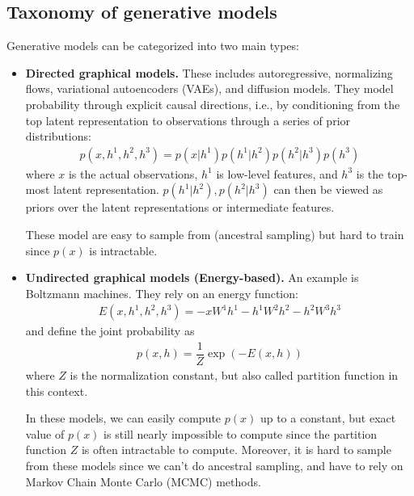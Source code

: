 \documentclass{mytufte-light}
\begin{document}
\subsection{Taxonomy of generative models}
Generative models can be categorized into two main types:
\begin{itemize}
    \item \textbf{Directed graphical models.} 
    These includes autoregressive, normalizing flows, variational autoencoders (VAEs), and diffusion models.
    They model probability through explicit causal directions, i.e., by 
    conditioning from the top latent representation to observations through 
    a series of prior distributions:
    \begin{align}
        p(x, h^1, h^2, h^3) = p(x|h^1) p(h^1|h^2) p(h^2|h^3) p(h^3)
    \end{align}
    where \( x \) is the actual observations, \( h^1 \) is low-level features, and \( h^3 \) is the top-most 
    latent representation. \( p(h^1|h^2), p(h^2|h^3)\) can then be viewed as priors over the latent representations or
    intermediate features.

    These model are easy to sample from (ancestral sampling) but hard to train since \( p(x) \) is intractable.

    
    \item \textbf{Undirected graphical models (Energy-based).}
    An example is Boltzmann machines. They rely on an energy function:
    \begin{align}
        E(x, h^1, h^2, h^3) = -xW^1 h^1 - h^1 W^2 h^2 - h^2 W^3 h^3
    \end{align}
    and define the joint probability as 
    \begin{align}
        p(x,h) = \dfrac{1}{Z} \exp(-E(x,h))
    \end{align}
    where \(Z\) is the normalization constant, but also called partition function in this context.
    
    In these models, we can easily compute \( p(x) \) up to a constant, but exact 
    value of \( p(x) \) is still nearly impossible to compute since 
    the partition function \(Z\) is often intractable to compute.
    Moreover, it is hard to sample from these models since we can't do ancestral sampling, 
    and have to rely on Markov Chain Monte Carlo (MCMC) methods.
\end{itemize}
\end{document}
